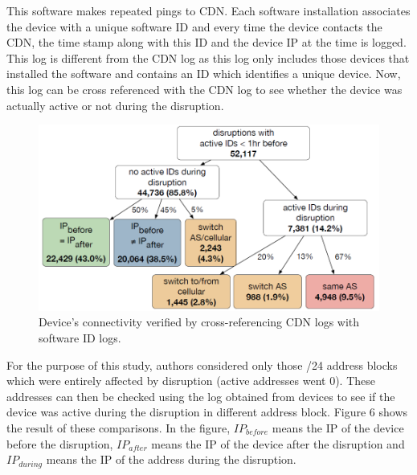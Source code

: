\documentclass[11pt,twoside,a4paper]{article}
\begin{document}
This software makes repeated pings to CDN. Each software installation associates the device with a unique software ID and every time the device contacts the CDN, the time stamp along with this ID and the device IP at the time is logged. This log is different from the CDN log as this log only includes those devices that installed the software and contains an ID which identifies a unique device. Now, this log can be cross referenced with the CDN log to see whether the device was actually active or not during the disruption.

\begin{figure}[h!] 
\centering
  \includegraphics[width=0.6\linewidth]{Figures/6.png}
  \caption{Device's connectivity verified by cross-referencing CDN logs with software ID logs.}
  \label{fig:DeviceIDLog}
\end{figure}
For the purpose of this study, authors considered only those /24 address blocks which were entirely affected by disruption (active addresses went 0). These addresses can then be checked using the log obtained from devices to see if the device was active during the disruption in different address block. Figure 6 shows the result of these comparisons. In the figure, $IP_{before}$ means the IP of the device before the disruption, $IP_{after}$ means the IP of the device after the disruption and $IP_{during}$ means the IP of the address during the disruption.
\end{document}
